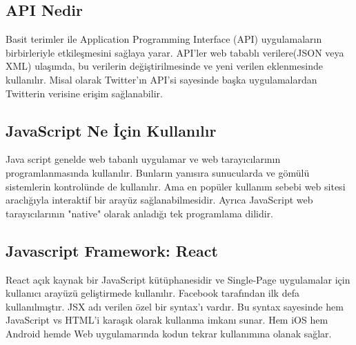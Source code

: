 \subsection{API Nedir}
Basit terimler ile Application Programming Interface (API) uygulamaların birbirleriyle etkileşmesini sağlaya yarar. API'ler web tabablı verilere(JSON veya XML) ulaşımda, bu verilerin değiştirilmesinde ve yeni verilen eklenmesinde kullanılır. Misal olarak Twitter'ın API'si sayesinde başka uygulamalardan Twitterin verisine erişim sağlanabilir.\cite{whatisapi}
\subsection{JavaScript Ne İçin Kullanılır}
Java script genelde web tabanlı uygulamar ve web tarayıcılarının programlanmasında kullanılır. Bunların yanısıra sunucularda ve gömülü sistemlerin kontrolünde de kullanılır. Ama en popüler kullanım sebebi web sitesi araclığıyla interaktif bir arayüz sağlanabilmesidir. Ayrıca JavaScript web tarayıcılarının "native" olarak anladığı tek programlama dilidir.\cite{whyjs}
\subsection{Javascript Framework: React}
React açık kaynak bir JavaScript kütüphanesidir ve Single-Page uygulamalar için kullanıcı arayüzü geliştirmede kullanılır. Facebook tarafından ilk defa kullanılmıştır. JSX adı verilen özel bir syntax'ı vardır. Bu syntax sayesinde hem JavaScript vs HTML'i karaşık olarak kullanma imkanı sunar. Hem iOS hem Android hemde Web uygulamarında kodun tekrar kullanımına olanak sağlar.\cite{react}
